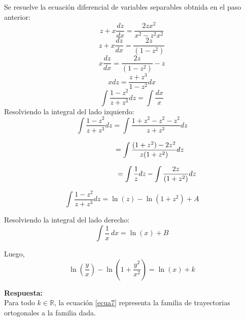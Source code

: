 \documentclass[12pt,letterpaper]{article}
\begin{document}
\begin{titlepage}
\begin{flushleft}

Se resuelve la ecuación diferencial de variables separables obtnida en el paso anterior:
\begin{equation*} 
z + x \frac{dz}{dx} = \frac{2zx^{2}}{x^{2}- z^{2}x^{2}}
\end{equation*}
\begin{equation*} 
z + x \frac{dz}{dx} = \frac{2z}{(1- z^{2})}
\end{equation*}
\begin{equation*} 
x \frac{dz}{dx} = \frac{2z}{(1- z^{2})} - z
\end{equation*}
\begin{equation*} 
x{dz} = \frac{z + z^{3}}{1- z^{2}} dx 
\end{equation*}
\begin{equation*} 
\int\frac{1- z^{2}}{z + z^{3}} dz = \int \frac{dx}{x} 
\end{equation*}
Resolviendo la integral del lado izquierdo:
\begin{equation*} 
\int\frac{1- z^{2}}{z + z^{3}} dz = \int\frac{1+z^{2} - z^{2} - z^{2}}{z + z^{3}} dz
\end{equation*}

\begin{equation*} 
 \hspace{1.8cm}= \int\frac{(1+z^{2}) - 2z^{2}}{z (1+ z^{2})} dz
\end{equation*}

\begin{equation*} 
 \hspace{2.5cm}= \int\frac{1}{z} dz - \int\frac{2z}{(1+ z^{2})} dz
\end{equation*}

\begin{equation*} 
\int\frac{1- z^{2}}{z + z^{3}} dz = \ln(z)- \ln(1+ z^{2}) + A
\end{equation*}

Resolviendo la integral del lado derecho:
\begin{equation*} 
\int \frac{1}{x} \,dx = \ln(x) + B
\end{equation*}

Luego,
\begin{equation} \tag{7} \label{ecua7}
\ln(\frac{y}{x})- \ln(1 + \frac{y^{2}}{x^{2}}) = \ln(x) + k
\end{equation}

\textbf{Respuesta:}\\
\vspace{0.5cm}
Para todo $k \in \mathbb R $, la ecuación \eqref{ecua7} representa la familia de trayectorias ortogonales  a la familia dada.
\end{flushleft}
\end{titlepage}
\end{document}
